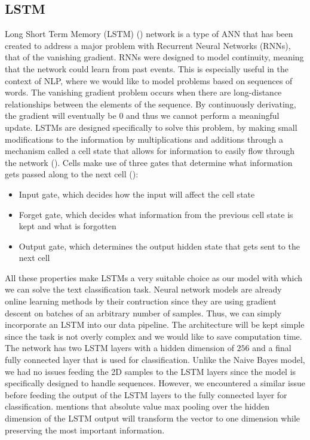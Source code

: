 \documentclass[12pt]{extreport}
\begin{document}
\subsection{LSTM} \label{sec:lstm}

Long Short Term Memory (LSTM) (\cite{lstm}) network is a type of ANN that has been created to address a major problem with Recurrent Neural Networks (RNNs), that of the vanishing gradient. RNNs were designed to model continuity, meaning that the network could learn from past events. This is especially useful in the context of NLP, where we would like to model problems based on sequences of words. The vanishing gradient problem occurs when there are long-distance relationships between the elements of the sequence. By continuously derivating, the gradient will eventually be 0 and thus we cannot perform a meaningful update. LSTMs are designed specifically to solve this problem, by making small modifications to the information by multiplications and additions through a mechanism called a cell state that allows for information to easily flow through the network (\cite{lstmrnnfundamentals}). Cells make use of three gates that determine what information gets passed along to the next cell (\cite{colahlstm}):

\begin{itemize}
    \item Input gate, which decides how the input will affect the cell state
    \item Forget gate, which decides what information from the previous cell state is kept and what is forgotten
    \item Output gate, which determines the output hidden state that gets sent to the next cell
\end{itemize}

All these properties make LSTMs a very suitable choice as our model with which we can solve the text classification task. Neural network models are already online learning methods by their contruction since they are using gradient descent on batches of an arbitrary number of samples. Thus, we can simply incorporate an LSTM into our data pipeline. The architecture will be kept simple since the task is not overly complex and we would like to save computation time. The network has two LSTM layers with a hidden dimension of $256$ and a final fully connected layer that is used for classification. Unlike the Naive Bayes model, we had no issues feeding the 2D samples to the LSTM layers since the model is specifically designed to handle sequences. However, we encountered a similar issue before feeding the output of the LSTM layers to the fully connected layer for classification. \cite{maxpoolinglstm} mentions that absolute value max pooling over the hidden dimension of the LSTM output will transform the vector to one dimension while preserving the most important information.
\end{document}
